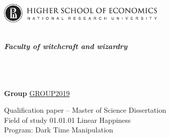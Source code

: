 \documentclass[11pt, oneside]{Thesis} %
\begin{document}
\begin{titlepage}
\begin{center}

\begin{minipage}{0.99\textwidth}
\begin{flushleft} \large
\includegraphics[width=8cm]{./Figures/logo_hse.jpg} %
\end{flushleft}
\end{minipage}

\textsc{\univname}\\[1.5cm] %
\textbf{\textit{\Large Faculty of witchcraft and wizardry}}\\[0.5cm] %
\href{https://github.com/super-position}{\authornames} %


\HRule \\[0.4cm] %
{\huge \bfseries \ttitle}\\[0.4cm] %
\HRule \\[1.5cm] %

 
\textbf{Group} \underline{GROUP2019}

\large \textbf{}{Qualification paper – Master of Science Dissertation\\ Field of study 01.01.01 Linear Happiness}\\[0.3cm] %

\textbf{}{Program: Dark Time Manipulation}\\[0.4cm]

 


\end{center}
\end{titlepage}
\end{document}
